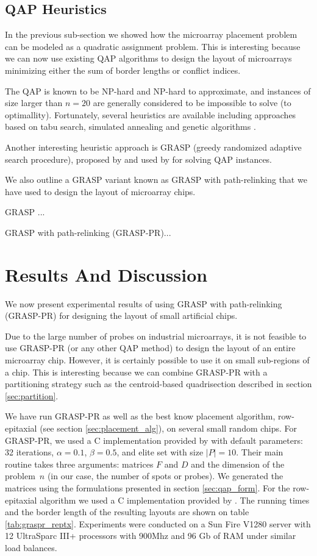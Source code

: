 \documentclass{bioinfo}
\begin{document}
\subsection{QAP Heuristics}

In the previous sub-section we showed how the microarray placement problem can be modeled as a quadratic assignment problem. This is interesting because we can now use existing QAP algorithms to design the layout of microarrays minimizing either the sum of border lengths or conflict indices. 

The QAP is known to be NP-hard and NP-hard to approximate, and instances of size larger than $n = 20$ are generally considered to be impossible to solve (to optimallity). Fortunately, several heuristics are available including approaches based on tabu search, simulated annealing and genetic algorithms \citep{CELA98}.

Another interesting heuristic approach is GRASP (greedy randomized adaptive search procedure), proposed by \citealp{FEO95} and used by \citealp{LI94} for solving QAP instances.

We also outline a GRASP variant known as GRASP with path-relinking \citep{OLIVEIRA04} that we have used to design the layout of microarray chips.

GRASP ...

GRASP with path-relinking (GRASP-PR)...

\section{Results And Discussion}
\label{sec:results}

We now present experimental results of using GRASP with path-relinking (GRASP-PR) for designing the layout of small artificial chips.

Due to the large number of probes on industrial microarrays, it is not feasible to use GRASP-PR (or any other QAP method) to design the layout of an entire microarray chip. However, it is certainly possible to use it on small sub-regions of a chip. This is interesting because we can combine GRASP-PR with a partitioning strategy such as the centroid-based quadrisection described in section \ref{sec:partition}.

We have run GRASP-PR as well as the best know placement algorithm, row-epitaxial (see section \ref{sec:placement_alg}), on several small random chips. For GRASP-PR, we used a C implementation provided by \citealp{OLIVEIRA04} with default parameters: 32 iterations, $\alpha=0.1$, $\beta=0.5$, and elite set with size $\mid P\mid = 10$. Their main routine takes three arguments: matrices $F$ and $D$ and the dimension of the problem~$n$ (in our case, the number of spots or probes). We generated the matrices using the formulations presented in section \ref{sec:qap_form}. For the row-epitaxial algorithm we used a C implementation provided by \citealp{KAHNG03_1}. The running times and the border length of the resulting layouts are shown on table \ref{tab:graspr_reptx}. Experiments were conducted on a Sun Fire V1280 server with 12 UltraSparc III+ processors with 900Mhz and 96 Gb of RAM under similar load balances.
\end{document}

